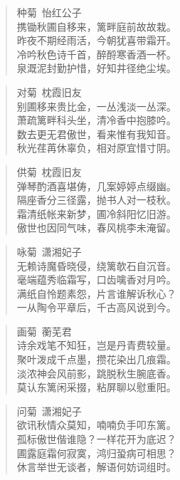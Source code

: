 \documentclass[12pt,oneside]{book}
\newenvironment{shici}{%
\begin{verse}%
\centering\large\hspace{12pt}}%
{\end{verse}}
\begin{document}
\begin{shici}
种菊~怡红公子\\
携锄秋圃自移来，篱畔庭前故故栽。\\
昨夜不期经雨活，今朝犹喜带霜开。\\
冷吟秋色诗千首，醉酹寒香酒一杯。\\
泉溉泥封勤护惜，好知井径绝尘埃。
\end{shici}

\begin{shici}
对菊~枕霞旧友\\
别圃移来贵比金，一丛浅淡一丛深。\\
萧疏篱畔科头坐，清冷香中抱膝吟。\\
数去更无君傲世，看来惟有我知音。\\
秋光荏苒休辜负，相对原宜惜寸阴。
\end{shici}

\begin{shici}
供菊~枕霞旧友\\
弹琴酌酒喜堪俦，几案婷婷点缀幽。\\
隔座香分三径露，抛书人对一枝秋。\\
霜清纸帐来新梦，圃冷斜阳忆旧游。\\
傲世也因同气味，春风桃李未淹留。
\end{shici}

\begin{shici}
咏菊~潇湘妃子\\
无赖诗魔昏晓侵，绕篱欹石自沉音。\\
毫端蕴秀临霜写，口齿噙香对月吟。\\
满纸自怜题素怨，片言谁解诉秋心？\\
一从陶令平章后，千古高风说到今。
\end{shici}

\begin{shici}
画菊~蘅芜君\\
诗余戏笔不知狂，岂是丹青费较量。\\
聚叶泼成千点墨，攒花染出几痕霜。\\
淡浓神会风前影，跳脱秋生腕底香。\\
莫认东篱闲采掇，粘屏聊以慰重阳。
\end{shici}

\begin{shici}
问菊~潇湘妃子\\
欲讯秋情众莫知，喃喃负手叩东篱。\\
孤标傲世偕谁隐？一样花开为底迟？\\
圃露庭霜何寂寞，鸿归蛩病可相思？\\
休言举世无谈者，解语何妨词组时。
\end{shici}
\end{document}
